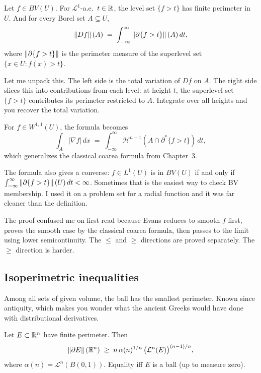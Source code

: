 \begin{theorem}\label{thm:coarea-bv}
Let $f \in BV(U)$. For $\mathcal{L}^1$-a.e.\ $t \in \mathbb{R}$, the level set $\{f > t\}$ has finite perimeter in $U$. And for every Borel set $A \subseteq U$,
\[
  \left\|Df\right\|(A) \;=\; \int_{-\infty}^{\infty} \left\|\partial\{f > t\}\right\|(A)\, dt,
\]
where $\left\|\partial\{f > t\}\right\|$ is the perimeter measure of the superlevel set $\{x \in U : f(x) > t\}$.
\end{theorem}

Let me unpack this. The left side is the total variation of $Df$ on $A$. The right side slices this into contributions from each level: at height $t$, the superlevel set $\{f > t\}$ contributes its perimeter restricted to $A$. Integrate over all heights and you recover the total variation.

For $f \in W^{1,1}(U)$, the formula becomes
\[
  \int_A |\nabla f| \, dx \;=\; \int_{-\infty}^{\infty} \mathcal{H}^{n-1}(A \cap \partial^*\{f > t\})\, dt,
\]
which generalizes the classical coarea formula from Chapter~3.

\begin{remark}\label{rmk:coarea-converse}
The formula also gives a converse: $f \in L^1(U)$ is in $BV(U)$ if and only if $\int_{-\infty}^\infty \left\|\partial\{f > t\}\right\|(U)\,dt < \infty$. Sometimes that is the easiest way to check BV membership. I used it on a problem set for a radial function and it was far cleaner than the definition.
\end{remark}

The proof confused me on first read because Evans reduces to smooth $f$ first, proves the smooth case by the classical coarea formula, then passes to the limit using lower semicontinuity. The $\le$ and $\ge$ directions are proved separately. The $\ge$ direction is harder.

\subsection{Isoperimetric inequalities}\label{subsec:isoperimetric}

Among all sets of given volume, the ball has the smallest perimeter. Known since antiquity, which makes you wonder what the ancient Greeks would have done with distributional derivatives.

\begin{theorem}\label{thm:isoperimetric}
Let $E \subset \mathbb{R}^n$ have finite perimeter. Then
\[
  \left\|\partial E\right\|(\mathbb{R}^n) \;\ge\; n\,\alpha(n)^{1/n}\, \bigl(\mathcal{L}^n(E)\bigr)^{(n-1)/n},
\]
where $\alpha(n) = \mathcal{L}^n(B(0,1))$. Equality iff $E$ is a ball (up to measure zero).
\end{theorem}

